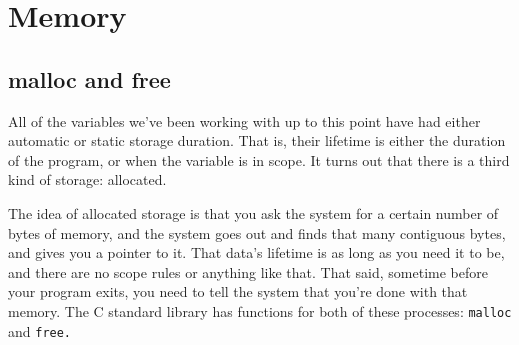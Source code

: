 \documentclass[ebook,11pt,oneside,openany]{memoir}
\begin{document}
\chapter{Memory}
\section{malloc and free}



All of the variables we've been working with up to this point have had either automatic or static storage duration. That is, their lifetime is either the duration of the program, or when the variable is in scope. It turns out that there is a third kind of storage: allocated.

The idea of allocated storage is that you ask the system for a certain number of bytes of memory, and the system goes out and finds that many contiguous bytes, and gives you a pointer to it. That data's lifetime is as long as you need it to be, and there are no scope rules or anything like that. That said, sometime before your program exits, you need to tell the system that you're done with that memory. The C standard library has functions for both of these processes: \texttt{malloc} and \texttt{free.}
\end{document}
